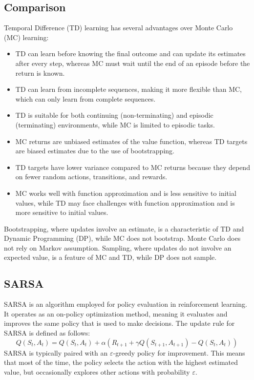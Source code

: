 \subsection{Comparison}
Temporal Difference (TD) learning has several advantages over Monte Carlo (MC) learning:
\begin{itemize}
    \item TD can learn before knowing the final outcome and can update its estimates after every step, whereas MC must wait until the end of an episode before the return is known.
    \item TD can learn from incomplete sequences, making it more flexible than MC, which can only learn from complete sequences.
    \item TD is suitable for both continuing (non-terminating) and episodic (terminating) environments, while MC is limited to episodic tasks.
    \item MC returns are unbiased estimates of the value function, whereas TD targets are biased estimates due to the use of bootstrapping.
    \item TD targets have lower variance compared to MC returns because they depend on fewer random actions, transitions, and rewards.
    \item MC works well with function approximation and is less sensitive to initial values, while TD may face challenges with function approximation and is more sensitive to initial values.
\end{itemize}
Bootstrapping, where updates involve an estimate, is a characteristic of TD and Dynamic Programming (DP), while MC does not bootstrap.
Monte Carlo does not rely on Markov assumption. 
Sampling, where updates do not involve an expected value, is a feature of MC and TD, while DP does not sample.

\subsection{SARSA}
SARSA is an algorithm employed for policy evaluation in reinforcement learning. 
It operates as an on-policy optimization method, meaning it evaluates and improves the same policy that is used to make decisions. 
The update rule for SARSA is defined as follows:
\[Q(S_t,A_t)=Q(S_t,A_t)+\alpha(R_{t+1}+\gamma Q(S_{t+1},A_{t+1})-Q(S_t,A_t))\]
SARSA is typically paired with an $\varepsilon$-greedy policy for improvement. 
This means that most of the time, the policy selects the action with the highest estimated value, but occasionally explores other actions with probability $\varepsilon$.

